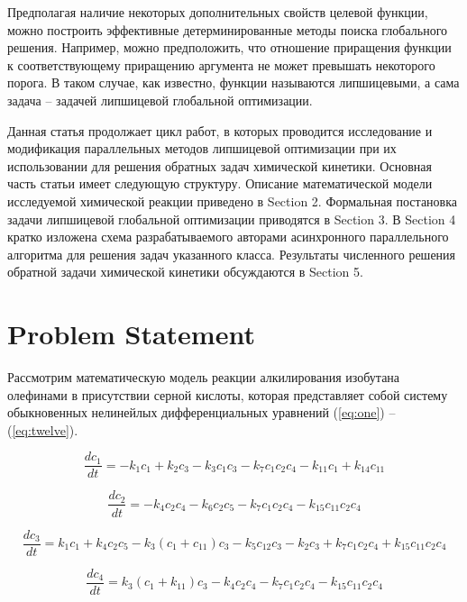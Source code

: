 \documentclass{svproc}
\begin{document}
Предполагая наличие некоторых дополнительных свойств целевой функции, можно построить эффективные детерминированные методы поиска глобального решения.
Например, можно предположить, что отношение приращения функции к соответствующему приращению аргумента не может превышать некоторого порога. В таком случае, как известно, функции называются липшицевыми, а сама задача -- задачей липшицевой глобальной оптимизации. 

Данная статья продолжает цикл работ, в которых проводится исследование и модификация параллельных методов липшицевой оптимизации при их использовании для решения обратных задач химической кинетики. 
Основная часть статьи имеет следующую структуру. Описание математической модели исследуемой химической реакции приведено в Section 2. Формальная постановка задачи липшицевой глобальной оптимизации приводятся в Section 3. В Section 4 кратко изложена схема разрабатываемого авторами асинхронного параллельного алгоритма для решения задач указанного класса. Результаты численного решения обратной задачи химической кинетики обсуждаются в Section 5.


\section{Problem Statement}\label{Sec_math_mod}

Рассмотрим математическую модель реакции алкилирования изобутана олефинами в присутствии серной кислоты, которая представляет собой систему обыкновенных нелинейлых дифференциальных уравнений (\ref{eq:one}) -- (\ref{eq:twelve}).

\begin{equation}
  \frac{dc_1}{dt} = -k_1c_1 + k_2c_3 - k_3c_1c_3 - k_7c_1c_2c_4 - k_{11}c_1 + k_{14}c_{11}
  \label{eq:one}
\end{equation}

\begin{equation}
  \frac{dc_2}{dt} = -k_4c_2c_4 - k_6c_2c_5 - k_7c_1c_2c_4 - k_{15}c_{11}c_2c_4
  \label{eq:two}
\end{equation}

\begin{equation}
  \frac{dc_3}{dt} = k_1c_1 + k_4c_2c_5 - k_3(c_1 + c_{11})c_3 - k_{5}c_{12}c_3 - k_2c_3 + k_7c_1c_2c_4 + k_{15}c_{11}c_2c_4
  \label{eq:three}
\end{equation}

\begin{equation}
  \frac{dc_4}{dt} = k_3(c_1 + k_{11})c_3 - k_4c_2c_4 - k_{7}c_{1}c_2c_4 - k_{15}c_{11}c_2c_4
  \label{eq:four}
\end{equation}
\end{document}
